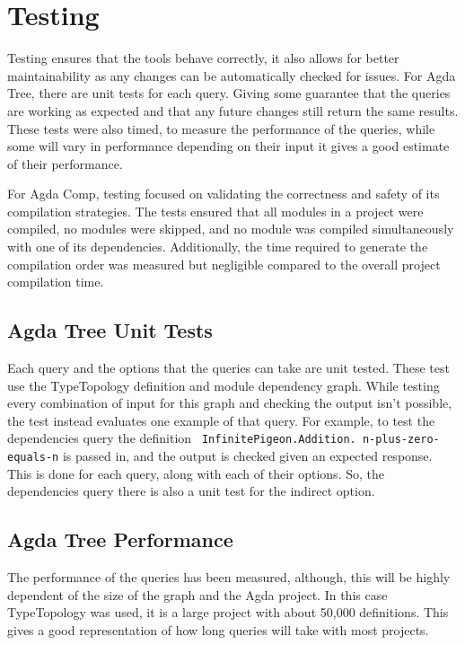 
\chapter{Testing}


Testing ensures that the tools behave correctly, it also allows for better
maintainability as any changes can be automatically checked for issues. For
Agda Tree, there are unit tests for each query. Giving some guarantee that the
queries are working as expected and that any future changes still return the
same results. These tests were also timed, to measure the performance of the
queries, while some will vary in performance depending on their input it gives
a good estimate of their performance.


For Agda Comp, testing focused on validating the correctness and safety of its
compilation strategies. The tests ensured that all modules in a project were
compiled, no modules were skipped, and no module was compiled simultaneously
with one of its dependencies. Additionally, the time required to generate the
compilation order was measured but negligible compared to the overall project
compilation time.


\section{Agda Tree Unit Tests}


Each query and the options that the queries can take are unit tested. These
test use the TypeTopology definition and module dependency graph. While testing
every combination of input for this graph and checking the output isn't
possible, the test instead evaluates one example of that query. For example, to
test the dependencies query the definition \texttt{ InfinitePigeon.Addition.
n-plus-zero-equals-n} is passed in, and the output is
checked given an expected response. This is done for each query, along with
each of their options. So, the dependencies query there is also a unit test
for the indirect option.

\section{Agda Tree Performance} \label{sub:agda tree performance}

The performance of the queries has been measured, although, this will be highly
dependent of the size of the graph and the Agda project. In this case
TypeTopology was used, it is a large project with about 50,000 definitions.
This gives a good representation of how long queries will take with most
projects.

